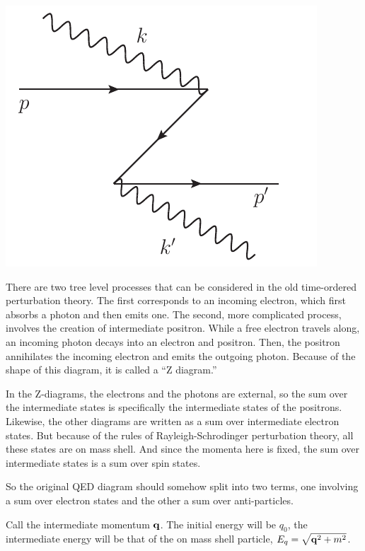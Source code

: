{\begin{minipage}{1.6in}
   \includegraphics[scale=0.8]{eps/Zdiag} 
\end{minipage}
} 
\vspace{1em}



There are two tree level processes that can be considered in the old time-ordered perturbation theory.  The first corresponds to an incoming electron, which first absorbs a photon and then emits one.  The second, more complicated process, involves the creation of intermediate positron.  While a free electron travels along, an incoming photon decays into an electron and positron.  Then, the positron annihilates the incoming electron and emits the outgoing photon.  Because of the shape of this diagram, it is called a ``Z diagram.''

In the Z-diagrams, the electrons and the photons are external, so the sum over the intermediate states is specifically the intermediate states of the positrons.  Likewise, the other diagrams are written as a sum over intermediate electron states.  But because of the rules of Rayleigh-Schrodinger perturbation theory, all these states are on mass shell.  And since the momenta here is fixed, the sum over intermediate states is a sum over spin states.

So the original QED diagram should somehow split into two terms, one involving a sum over electron states and the other a sum over anti-particles.  

Call the intermediate momentum $\mathbf{q}$.  The initial energy will be $q_0$, the intermediate energy will be that of the on mass shell particle, $E_q = \sqrt{\mathbf{q}^2 + m^2 }$.


